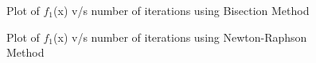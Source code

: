 \documentclass[12pt,a4paper]{article}
\begin{document}
\begin{figure}[!ht]
	\begin{center}
	\end{center}
	\caption{Plot of $f_1$(x) v/s number of iterations using Bisection Method}
\end{figure}
\clearpage
\begin{figure}[!ht]
	\begin{center}
	\end{center}
	\caption{Plot of $f_1$(x) v/s number of iterations using Newton-Raphson Method}
\end{figure}
\end{document}
